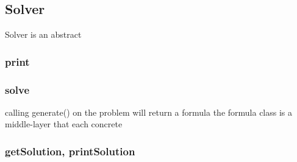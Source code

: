 \subsection{Solver}

Solver is an abstract 

\subsubsection{print}

\subsubsection{solve}
calling generate() on the problem will return a formula 
the formula class is a middle-layer that each concrete 

\subsubsection{getSolution, printSolution}